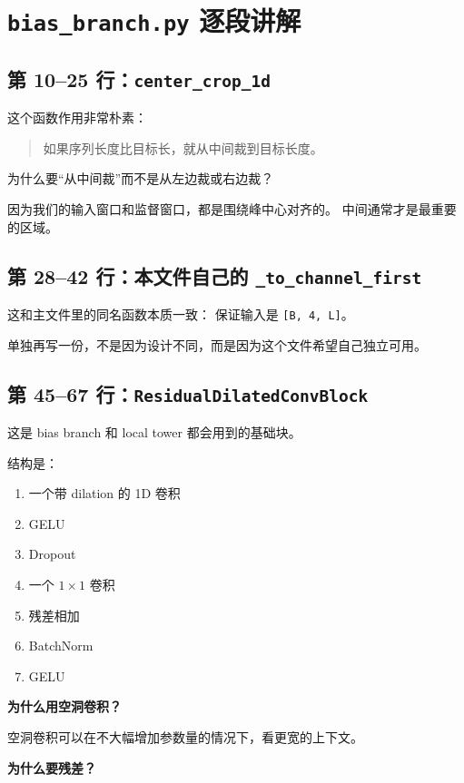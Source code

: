\documentclass[11pt,a4paper]{ctexart}
\begin{document}
\section{\texttt{bias\_branch.py} 逐段讲解}

\subsection{第 10--25 行：\texttt{center\_crop\_1d}}

这个函数作用非常朴素：

\begin{quote}
如果序列长度比目标长，就从中间裁到目标长度。
\end{quote}

为什么要“从中间裁”而不是从左边裁或右边裁？

因为我们的输入窗口和监督窗口，都是围绕峰中心对齐的。
中间通常才是最重要的区域。

\subsection{第 28--42 行：本文件自己的 \texttt{\_to\_channel\_first}}

这和主文件里的同名函数本质一致：
保证输入是 \texttt{[B, 4, L]}。

单独再写一份，不是因为设计不同，而是因为这个文件希望自己独立可用。

\subsection{第 45--67 行：\texttt{ResidualDilatedConvBlock}}

这是 bias branch 和 local tower 都会用到的基础块。

结构是：

\begin{enumerate}[leftmargin=2em]
\item 一个带 dilation 的 1D 卷积
\item GELU
\item Dropout
\item 一个 $1\times1$ 卷积
\item 残差相加
\item BatchNorm
\item GELU
\end{enumerate}

\textbf{为什么用空洞卷积？}

空洞卷积可以在不大幅增加参数量的情况下，看更宽的上下文。

\textbf{为什么要残差？}
\end{document}
